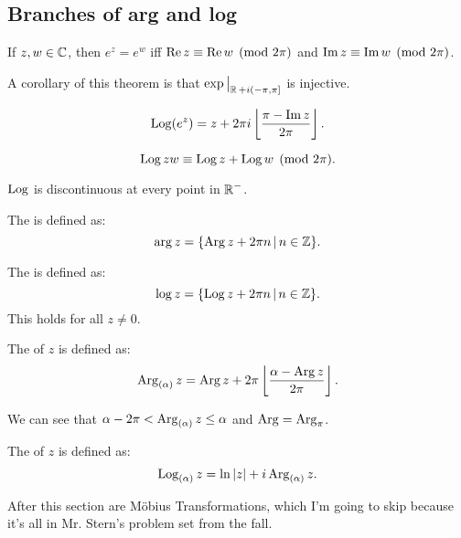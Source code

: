 \documentclass[notes]{subfile}
\begin{document}
\subsection{Branches of arg and log}

\begin{theorem}
    If $z, w \in \operatorname{\mathbb{C}}$, then $e^z = e^w$ iff $\operatorname{Re} z \equiv \operatorname{Re} w
    \pmod{2\pi}$ and $\operatorname{Im} z \equiv \operatorname{Im} w \pmod{2\pi}$.
\end{theorem}

A corollary of this theorem is that $\exp \big|_{\operatorname{\mathbb{R}} + i(-\pi, \pi]}$ is injective.

\begin{theorem}
    \[ \operatorname{Log}(e^z) = z + 2\pi i \left \lfloor{\frac{\pi - \operatorname{Im}z}{2\pi}}\right \rfloor. \]
\end{theorem}

\begin{theorem}
    \[ \operatorname{Log} zw \equiv \operatorname{Log} z + \operatorname{Log} w \pmod{2\pi}. \]
\end{theorem}

\begin{theorem}
    $\operatorname{Log}$ is discontinuous at every point in $\operatorname{\mathbb{R}}^-$.
\end{theorem}

\begin{definition}
    The  is defined as:
    \[ \arg z = \{ \operatorname{Arg} z + 2\pi n \, | \, n \in \operatorname{\mathbb{Z}} \}. \]
\end{definition}

\begin{definition}
    The  is defined as:
    \[ \log z = \{ \operatorname{Log} z + 2\pi n \, | \, n \in \operatorname{\mathbb{Z}} \}. \]
    This holds for all $z \ne 0$.
\end{definition}

\begin{definition}
    The  of $z$ is defined as:
    \[ \operatorname{Arg}_{(\alpha)} z = \operatorname{Arg} z + 2\pi \left \lfloor{\frac{\alpha - \operatorname{Arg}z}{2\pi}}\right \rfloor. \]
\end{definition}
We can see that $\alpha - 2\pi < \operatorname{Arg}_{(\alpha)} z \le \alpha$
and $\operatorname{Arg} = \operatorname{Arg}_{\pi}$.

\begin{definition}
    The  of $z$ is defined as:
    \[ \operatorname{Log}_{(\alpha)} z = \ln |z| + i \operatorname{Arg}_{(\alpha)} z. \]
\end{definition}

After this section are M\"{o}bius Transformations,
which I'm going to skip because it's all in Mr. Stern's
problem set from the fall.
\end{document}
